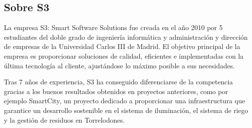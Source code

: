 \subsection{Sobre S3}
\par La empresa S3: Smart Software Solutions fue creada en el año 2010 por 5 estudiantes del doble grado de ingeniería informática y administración y dirección de empresas de la Universidad Carlos III de Madrid. El objetivo principal de la empresa es proporcionar soluciones de calidad, eficientes e implementadas con la última tecnología al cliente, ajustándose lo máximo posible a sus necesidades.
\par Tras 7 años de experiencia, S3 ha conseguido diferenciarse de la competencia gracias a los buenos resultados obtenidos en proyectos anteriores, como por ejemplo SmartCity, un proyecto dedicado a proporcionar una infraestructura que garantice un desarrollo sostenible en el sistema de iluminación, el sistema de riego y  la gestión de residuos en Torrelodones. 
